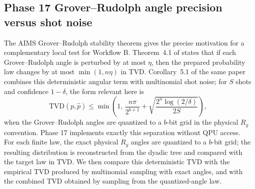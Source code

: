\subsection{Phase 17 Grover--Rudolph angle precision versus shot noise}
\label{subsec:phase17-angle-precision}

The AIMS Grover--Rudolph stability theorem gives the precise motivation for a
complementary local test for Workflow B. Theorem~4.1 of
\cite{falco2026grproof} states that if each Grover--Rudolph angle is perturbed
by at most \(\eta\), then the prepared probability law changes by at most
\(\min(1,n\eta)\) in TVD. Corollary~5.1 of the same paper combines this
deterministic angular term with multinomial shot noise; for \(S\) shots and
confidence \(1-\delta\), the form relevant here is
\[
  \mathrm{TVD}(p,\widehat p)
  \le
  \min\left(
    1,\,
    \frac{n\pi}{2^{b+1}}
    +
    \sqrt{\frac{2^n\log(2/\delta)}{2S}}
  \right),
\]
when the Grover--Rudolph angles are quantized to a \(b\)-bit grid in the
physical \(R_y\) convention. Phase 17 implements exactly this separation
without QPU access. For each finite law, the exact physical \(R_y\) angles are
quantized to a \(b\)-bit grid; the resulting distribution is reconstructed from
the dyadic tree and compared with the target law in TVD. We then compare this
deterministic TVD with the empirical TVD produced by multinomial sampling with
exact angles, and with the combined TVD obtained by sampling from the
quantized-angle law.

\begin{table}[h]
\centering
{}
\caption{Phase 17 local Grover--Rudolph angle-precision diagnostic at
\(b=8\) physical-angle bits and 4096 shots, with 1000 multinomial trials.}
\label{tab:phase17-angle-precision}
\end{table}

